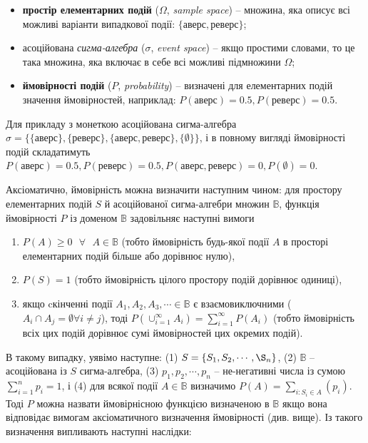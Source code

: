 \documentclass[
  11pt,
]{book}
\begin{document}
\begin{itemize}
\item
  \textbf{простір елементарних подій} (\(\Omega\), \emph{sample space}) -- множина, яка описує всі можливі варіанти випадкової події: \(\{аверс, реверс\}\);
\item
  асоційована \emph{сигма-алгебра} (\(\sigma\), \emph{event space}) -- якщо простими словами, то це така множина, яка включає в себе всі можливі підмножини \(\Omega\);
\item
  \textbf{ймовірності подій} (\(P\), \emph{probability}) -- визначені для елементарних подій значення ймовірностей, наприклад: \(P(аверс) = 0.5, P(реверс) = 0.5\).
\end{itemize}

Для прикладу з монеткою асоційована сигма-алгебра \(\sigma = \{\{аверс\}, \{реверс\}, \{аверс, реверс\}, \{\emptyset\}\}\), і в повному вигляді ймовірності подій складатимуть \(P(аверс) = 0.5, P(реверс) = 0.5, P({аверс, реверс}) = 0, P(\emptyset) = 0\).

Аксіоматично, ймовірність можна визначити наступним чином: для простору елементарних подій \(S\) й асоційованої сигма-алгебри множин \(\mathbb{B}\), функція ймовірності \(P\) із доменом \(\mathbb{B}\) задовільняє наступні вимоги

\begin{enumerate}
\def\labelenumi{\arabic{enumi}.}
\item
  \(P(A) \geq 0 \text{ } \forall \text{ } A \in \mathbb{B}\) (тобто ймовірність будь-якої події \(A\) в просторі елементарних подій більше або дорівнює нулю),
\item
  \(P(S) = 1\) (тобто ймовірність цілого простору подій дорівнює одиниці),
\item
  якщо cкінченні події \(A_1, A_2, A_3, \cdots \in \mathbb{B}\) є взаємовиключними (\(A_i \cap A_j = \emptyset \forall i \neq j\)), тоді \(P(\cup_{i=1}^{\infty} A_i) = \sum_{i=1}^{\infty} P(A_i)\) (тобто ймовірність всіх цих подій дорівнює сумі ймовірностей цих окремих подій).
\end{enumerate}

В такому випадку, уявімо наступне: (1) \(S = \{S_1, S_2, \cdots, \S_n\}\), (2) \(\mathbb{B}\) -- асоційована із \(S\) сигма-алгебра, (3) \(p_1, p_2, \cdots, p_n\) -- не-негативні числа із сумою \(\sum_{i=1}^n p_i = 1\), і (4) для всякої події \(A \in \mathbb{B}\) визначимо \(P(A) = \sum_{i:S_i \in A}(p_i)\). Тоді \(P\) можна назвати ймовірнісною функцією визначеною в \(\mathbb{B}\) якщо вона відповідає вимогам аксіоматичного визначення ймовірності (див. вище). Із такого визначення випливають наступні наслідки:
\end{document}
